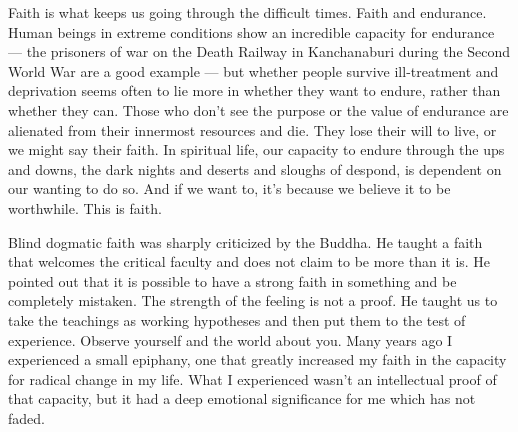 Faith is what keeps us going through the difficult times. Faith and
endurance. Human beings in extreme conditions show an incredible
capacity for endurance --- the prisoners of war on the Death Railway in
Kanchanaburi during the Second World War are a good example --- but
whether people survive ill-treatment and deprivation seems often to lie
more in whether they want to endure, rather than whether they can. Those
who don't see the purpose or the value of endurance are alienated from
their innermost resources and die. They lose their will to live, or we
might say their faith. In spiritual life, our capacity to endure through
the ups and downs, the dark nights and deserts and sloughs of despond,
is dependent on our wanting to do so. And if we want to, it's because we
believe it to be worthwhile. This is faith.

Blind dogmatic faith was sharply criticized by the Buddha. He taught a
faith that welcomes the critical faculty and does not claim to be more
than it is. He pointed out that it is possible to have a strong faith in
something and be completely mistaken. The strength of the feeling is not
a proof. He taught us to take the teachings as working hypotheses and
then put them to the test of experience. Observe yourself and the world
about you. Many years ago I experienced a small epiphany, one that
greatly increased my faith in the capacity for radical change in my
life. What I experienced wasn't an intellectual proof of that capacity,
but it had a deep emotional significance for me which has not faded.

